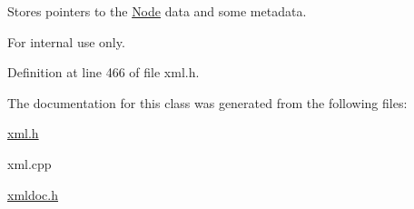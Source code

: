 Stores pointers to the \hyperlink{classphys_1_1xml_1_1Node}{Node} data and some metadata. 

\begin{DoxyInternal}{For internal use only.}
\end{DoxyInternal}


Definition at line 466 of file xml.h.



The documentation for this class was generated from the following files:\begin{DoxyCompactItemize}
\item 
\hyperlink{xml_8h}{xml.h}\item 
xml.cpp\item 
\hyperlink{xmldoc_8h}{xmldoc.h}\end{DoxyCompactItemize}
